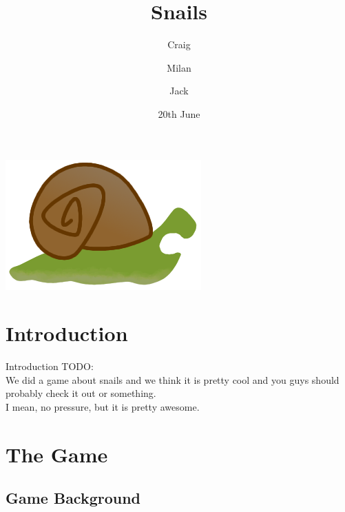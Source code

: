 \documentclass{beamer}
\title{Snails}
\author{Craig \and Milan \and Jack}
\date{20th June}
\begin{document}
\begin{frame}
  \titlepage
  \vspace{\baselineskip}
  \begin{center}
    \includegraphics[scale=0.15]{snail_teeth.png}
  \end{center}
\end{frame}

\section{Introduction}

\begin{frame}{Introduction}
  TODO:\\
  \vspace{\baselineskip}
  We did a game about snails and we think it is pretty cool and you guys should probably check it out or something.\\
  \vspace{\baselineskip}
  I mean, no pressure, but it is pretty awesome.
\end{frame}


\section{The Game}
\subsection{Game Background}
\end{document}
